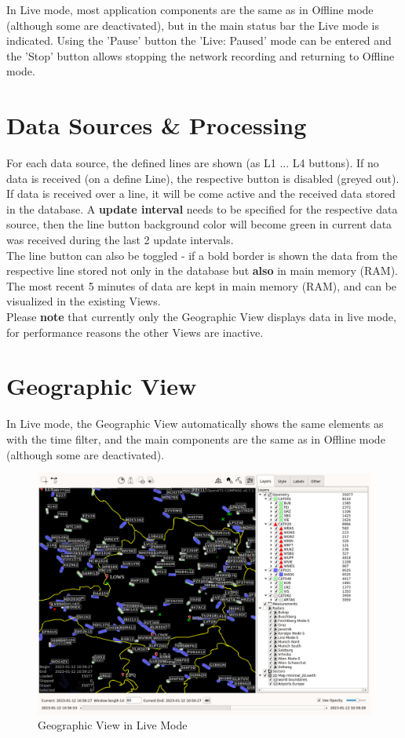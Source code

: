 In Live mode, most application components are the same as in Offline mode (although some are deactivated), but in the main status bar the Live mode is indicated. Using the 'Pause' button the 'Live: Paused' mode can be entered and the 'Stop' button allows stopping the network recording and returning to Offline mode.

\section{Data Sources \& Processing}

For each data source, the defined lines are shown (as L1 ... L4 buttons). If no data is received (on a define Line), the respective button is disabled (greyed out). If data is received over a line, it will be come active and the received data stored in the database. A \textbf{update interval} needs to be specified for the respective data source, then the line button background color will become green in current data was received during the last 2 update intervals. \\

The line button can also be toggled - if a bold border is shown the data from the respective line stored not only in the database but \textbf{also} in main memory (RAM). The most recent 5 minutes of data are kept in main memory (RAM), and can be visualized in the existing Views. \\

Please \textbf{note} that currently only the Geographic View displays data in live mode, for performance reasons the other Views are inactive.

\section{Geographic View}

In Live mode, the Geographic View automatically shows the same elements as with the time filter, and the main components are the same as in Offline mode (although some are deactivated).

\begin{figure}[H]
    \hspace*{-2.5cm}
    \includegraphics[width=19cm,frame]{figures/geo_live_mode.png}
  \caption{Geographic View in Live Mode}
\end{figure} 

